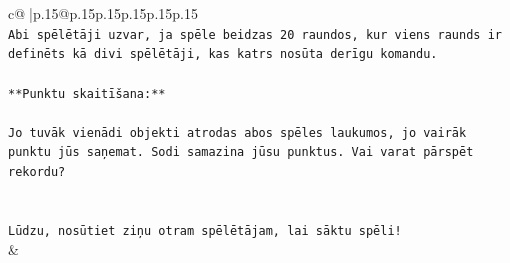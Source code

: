 \documentclass{article}
\begin{document}
{\begin{supertabular}{c@{$\;$}|p{.15\linewidth}@{}p{.15\linewidth}p{.15\linewidth}p{.15\linewidth}p{.15\linewidth}p{.15\linewidth}}
{{{\\ 
\texttt{Abi spēlētāji uzvar, ja spēle beidzas 20 raundos, kur viens raunds ir definēts kā divi spēlētāji, kas katrs nosūta derīgu komandu.} \\
\\ 
\texttt{**Punktu skaitīšana:**} \\
\\ 
\texttt{Jo tuvāk vienādi objekti atrodas abos spēles laukumos, jo vairāk punktu jūs saņemat. Sodi samazina jūsu punktus. Vai varat pārspēt rekordu?} \\
\\ 
\\ 
\texttt{Lūdzu, nosūtiet ziņu otram spēlētājam, lai sāktu spēli!} \\
            }
        }
    }
    & \\ \\


\end{supertabular}}
\end{document}
